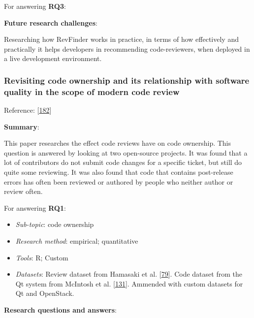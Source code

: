\documentclass[]{book}
\providecommand{\tightlist}{%
  \setlength{\itemsep}{0pt}\setlength{\parskip}{0pt}}
\begin{document}
For answering \textbf{RQ3}:

\textbf{Future research challenges}:

Researching how RevFinder works in practice, in terms of how effectively
and practically it helps developers in recommending code-reviewers, when
deployed in a live development environment.

\subsubsection{Revisiting code ownership and its relationship with
software quality in the scope of modern code
review}\label{revisiting-code-ownership-and-its-relationship-with-software-quality-in-the-scope-of-modern-code-review}

Reference: {[}\protect\hyperlink{ref-thongtanunam2016revisiting}{182}{]}

\textbf{Summary}:

This paper researches the effect code reviews have on code ownership.
This question is answered by looking at two open-source projects. It was
found that a lot of contributors do not submit code changes for a
specific ticket, but still do quite some reviewing. It was also found
that code that contains post-release errors has often been reviewed or
authored by people who neither author or review often.

For answering \textbf{RQ1}:

\begin{itemize}
\tightlist
\item
  \emph{Sub-topic}: code ownership
\item
  \emph{Research method}: empirical; quantitative
\item
  \emph{Tools}: R; Custom
\item
  \emph{Datasets}: Review dataset from Hamasaki et al.
  {[}\protect\hyperlink{ref-hamasaki2013does}{79}{]}. Code dataset from
  the Qt system from McIntosh et al.
  {[}\protect\hyperlink{ref-mcintosh2014impact}{131}{]}. Ammended with
  custom datasets for Qt and OpenStack.
\end{itemize}

\textbf{Research questions and answers}:
\end{document}
